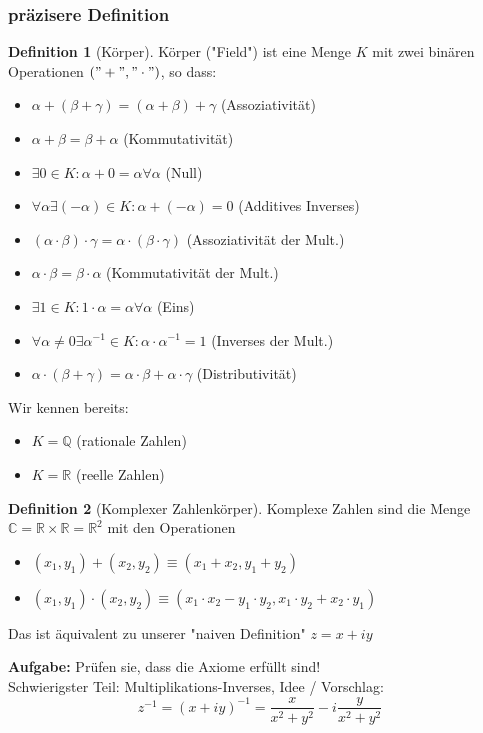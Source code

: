 \documentclass[a4paper]{scrartcl}
\DeclareMathOperator{\Exists}{\exists}
\DeclareMathOperator{\Forall}{\forall}
\theoremstyle{definition}
\newtheorem{defn}{Definition}
\theoremstyle{plain}
\theoremstyle{remark}
\theoremstyle{remark}
\newcommand{\I}{\ensuremath{i}}%
\begin{document}
\subsubsection{präzisere Definition}
\label{sec-5-1-3}
\begin{defn}[Körper]
Körper ("Field") ist eine Menge $K$ mit zwei binären Operationen $("+","\cdot")$, so dass:
\begin{itemize}
\item $\alpha + (\beta + \gamma) = (\alpha + \beta) + \gamma$ \hfill (Assoziativität)
\item $\alpha + \beta = \beta + \alpha$ \hfill (Kommutativität)
\item $\Exists 0 \in K: \alpha + 0 = \alpha \Forall \alpha$ \hfill (Null)
\item $\Forall \alpha \Exists (-\alpha) \in K: \alpha + (-\alpha) = 0$ \hfill (Additives Inverses)
\item $(\alpha \cdot \beta) \cdot \gamma = \alpha \cdot (\beta \cdot \gamma)$ \hfill (Assoziativität der Mult.)
\item $\alpha \cdot \beta = \beta \cdot \alpha$ \hfill (Kommutativität der Mult.)
\item $\Exists 1 \in K: 1\cdot \alpha = \alpha \Forall \alpha$ \hfill (Eins)
\item $\Forall \alpha \neq 0 \Exists \alpha^{-1} \in K: \alpha \cdot \alpha^{-1} = 1$ \hfill (Inverses der Mult.)
\item $\alpha\cdot (\beta + \gamma) = \alpha \cdot \beta + \alpha \cdot \gamma$ \hfill (Distributivität)
\end{itemize}
\end{defn}
Wir kennen bereits:
\begin{itemize}
\item $K = \mathbb{Q}$ \hfill (rationale Zahlen)
\item $K = \mathbb{R}$ \hfill (reelle Zahlen)
\end{itemize}
\begin{defn}[Komplexer Zahlenkörper]
Komplexe Zahlen sind die Menge $\mathbb{C} = \mathbb{R} \times \mathbb{R} = \mathbb{R}^2$ mit den Operationen
\begin{itemize}
\item $(x_1, y_1) + (x_2, y_2) \equiv (x_1 + x_2, y_1 + y_2)$
\item $(x_1, y_1) \cdot (x_2, y_2) \equiv (x_1 \cdot x_2 - y_1 \cdot y_2, x_1 \cdot y_2 + x_2 \cdot y_1)$
\end{itemize}
Das ist äquivalent zu unserer "naiven Definition" $z = x + \I y$
\end{defn}
\textbf{Aufgabe:} Prüfen sie, dass die Axiome erfüllt sind! \\
    Schwierigster Teil: Multiplikations-Inverses, Idee / Vorschlag:
\[z^{-1} = (x + \I y)^{-1} = \frac{x}{x^2 + y^2} - \I \frac{y}{x^2 + y^2}\]
\end{document}
